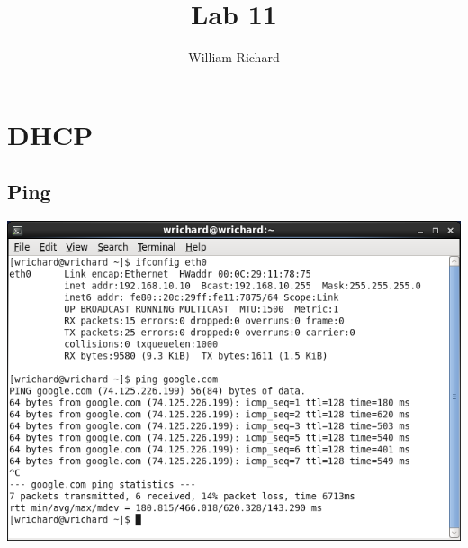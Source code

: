 \documentclass[a4paper,10pt]{article}
\title{Lab 11}
\author{William Richard}
\begin{document}
\maketitle

\section{DHCP}
\subsection{Ping}
  \begin{center}
  \includegraphics[width=\linewidth]{./ping.png}
  \end{center}
\end{document}
